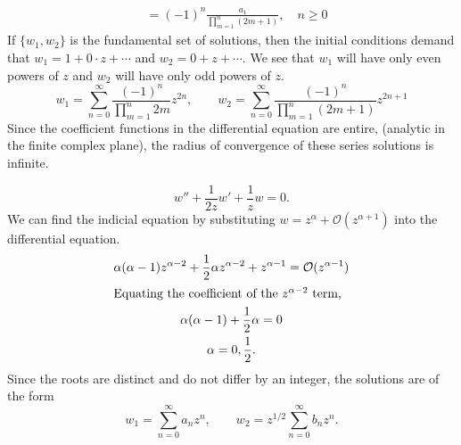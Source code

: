 {\begin{Solution}
\begin{align*}
    &= (-1)^n \frac{a_1}{ \prod_{m=1}^n (2m+1) }, \quad n \geq 0 
  \end{align*}
  If $\{w_1, w_2\}$ is the fundamental set of solutions, then the initial
  conditions demand that
  $w_1 = 1 + 0 \cdot z + \cdots$ and $w_2 = 0 + z + \cdots$.  We see that
  $w_1$ will have only even powers of $z$ and $w_2$ will have only odd powers
  of $z$.
  \[ 
  \boxed{ 
    w_1 = \sum_{n=0}^\infty \frac{ (-1)^n }{ \prod_{m=1}^n 2 m } z^{2 n},
    \qquad
    w_2 = \sum_{n=0}^\infty \frac{ (-1)^n }{ \prod_{m=1}^n (2 m + 1) } z^{2 n + 1}
    }
  \]
  Since the coefficient functions in the differential equation are entire, 
  (analytic in the finite complex plane), the radius of convergence of 
  these series solutions is infinite.
\end{Solution}











\begin{Solution}
  \label{solution w12zw1zw=0}
  \[ w'' + \frac{1}{2z} w' + \frac{1}{z} w = 0. \]
  We can find the indicial equation by substituting
  $w = z^\alpha + \mathcal{O}(z^{\alpha+1})$ into the differential equation.
  \begin{gather*}
    \alpha(\alpha-1) z^{\alpha-2} + \frac{1}{2} \alpha z^{\alpha-2}
    + z^{\alpha-1} = \mathcal{O}(z^{\alpha-1}) \\
    \intertext{Equating the coefficient of the $z^{\alpha-2}$ term,}
    \alpha(\alpha-1) + \frac{1}{2} \alpha = 0 \\
    \alpha = 0, \frac{1}{2}.
  \end{gather*}
  Since the roots are distinct and do not differ by an integer, the solutions
  are of the form
  \[ w_1 = \sum_{n=0}^\infty a_n z^n, \qquad w_2 = z^{1/2} \sum_{n=0}^\infty b_n z^n. \]


\end{Solution}}

